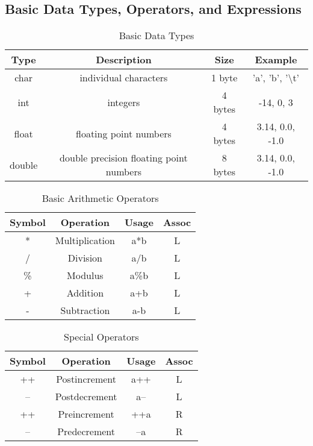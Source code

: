 \documentclass[answers,12pt,addpoints]{exam}
\begin{document}
\subsection{Basic Data Types, Operators, and Expressions}
\begin{table}[h!]
\centering
\begin{tabular}{|c|c|c|c|}
\hline
\textbf{Type} & \textbf{Description} & \textbf{Size} & \textbf{Example} \\ \hline
char & individual characters & 1 byte & 'a', 'b', '\textbackslash t' \\ \hline
int & integers & 4 bytes & -14, 0, 3 \\ \hline
float & floating point numbers & 4 bytes & 3.14, 0.0, -1.0 \\ \hline
double & double precision floating point numbers & 8 bytes & 3.14, 0.0, -1.0 \\ \hline
\end{tabular}
\caption{Basic Data Types}
\label{tab:basic-data-types}
\end{table}
    

\begin{table}[h!]
\centering
\begin{tabular}{|c|c|c|c|}
\hline
Symbol & Operation & Usage & Assoc \\ \hline
* & Multiplication & a*b & L \\ \hline
/ & Division & a/b & L \\ \hline
\% & Modulus & a\%b & L \\ \hline
+ & Addition & a+b & L \\ \hline
- & Subtraction & a-b & L \\ \hline
\end{tabular}
\caption{Basic Arithmetic Operators}
\label{tab:arith-operators}
\end{table}

\begin{table}[h!]
\centering
\begin{tabular}{|c|c|c|c|}
\hline
Symbol & Operation & Usage & Assoc \\ \hline
++ & Postincrement & a++ & L \\ \hline
-- & Postdecrement & a-- & L \\ \hline
++ & Preincrement & ++a & R \\ \hline
-- & Predecrement & --a & R \\ \hline
\end{tabular}
\caption{Special Operators}
\label{tab:special-operators}
\end{table}
\end{document}
